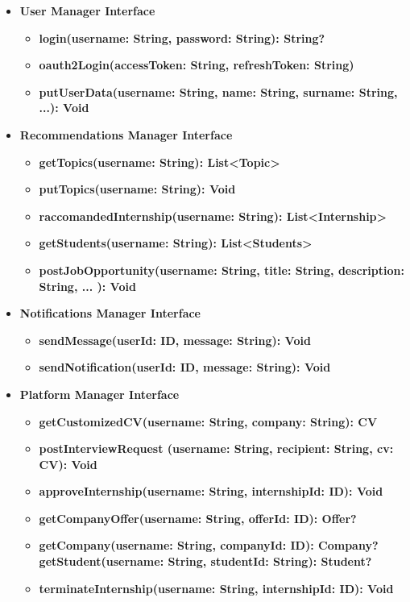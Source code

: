 \begin{itemize}
    \item \textbf{User Manager Interface}
          \begin{itemize}
              \item \textbf{login(username: String, password: String): String?}
              \item \textbf{oauth2Login(accessToken: String, refreshToken: String)}
              \item \textbf{putUserData(username: String, name: String, surname: String, ...): Void}
          \end{itemize}
          
    \item \textbf{Recommendations Manager Interface}
        \begin{itemize}
            \item \textbf{getTopics(username: String): List<Topic>}
            \item \textbf{putTopics(username: String): Void}
            \item \textbf{raccomandedInternship(username: String): List<Internship>}
            \item \textbf{getStudents(username: String): List<Students>}
            \item \textbf{postJobOpportunity(username: String, title: String, description: String, ... ): Void}
        \end{itemize}

              
    \item \textbf{Notifications Manager Interface}
        \begin{itemize}
            \item \textbf{sendMessage(userId: ID, message: String): Void}
            \item \textbf{sendNotification(userId: ID, message: String): Void}
        \end{itemize}
          
    \item \textbf{Platform Manager Interface}
        \begin{itemize}
            \item \textbf{getCustomizedCV(username: String, company: String): CV}
            \item \textbf{postInterviewRequest (username: String, recipient: String, cv: CV): Void}
             \item \textbf{approveInternship(username: String, internshipId: ID): Void}
             \item \textbf{getCompanyOffer(username: String, offerId: ID): Offer?}
             \item \textbf{getCompany(username: String, companyId: ID): Company?}
             \textbf{getStudent(username: String, studentId: String):   Student?}
             \item \textbf{terminateInternship(username: String, internshipId: ID): Void}
        \end{itemize}


\end{itemize}
